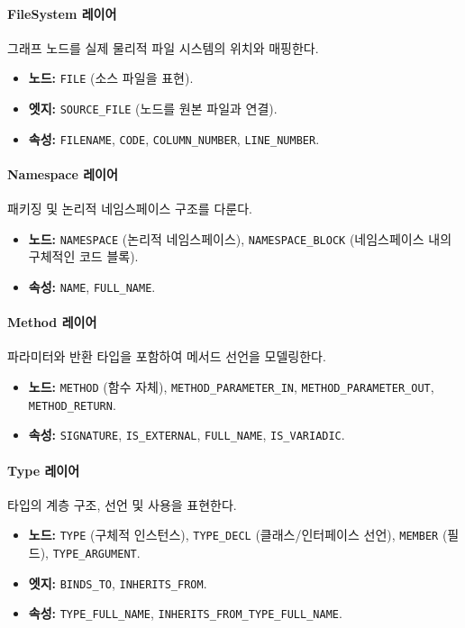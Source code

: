 \paragraph{FileSystem 레이어} 그래프 노드를 실제 물리적 파일 시스템의 위치와 매핑한다.
\begin{itemize} \setlength{\itemsep}{0pt} \setlength{\parskip}{0pt} \setlength{\topsep}{0pt} \setlength{\partopsep}{0pt}
    \item \textbf{노드:} \texttt{FILE} (소스 파일을 표현).
    \item \textbf{엣지:} \texttt{SOURCE\_FILE} (노드를 원본 파일과 연결).
    \item \textbf{속성:} \texttt{FILENAME}, \texttt{CODE}, \texttt{COLUMN\_NUMBER}, \texttt{LINE\_NUMBER}.
\end{itemize}

\paragraph{Namespace 레이어} 패키징 및 논리적 네임스페이스 구조를 다룬다.
\begin{itemize} \setlength{\itemsep}{0pt} \setlength{\parskip}{0pt} \setlength{\topsep}{0pt} \setlength{\partopsep}{0pt}
    \item \textbf{노드:} \texttt{NAMESPACE} (논리적 네임스페이스), \texttt{NAMESPACE\_BLOCK} (네임스페이스 내의 구체적인 코드 블록).
    \item \textbf{속성:} \texttt{NAME}, \texttt{FULL\_NAME}.
\end{itemize}

\paragraph{Method 레이어} 파라미터와 반환 타입을 포함하여 메서드 선언을 모델링한다.
\begin{itemize} \setlength{\itemsep}{0pt} \setlength{\parskip}{0pt} \setlength{\topsep}{0pt} \setlength{\partopsep}{0pt}
    \item \textbf{노드:} \texttt{METHOD} (함수 자체), \texttt{METHOD\_PARAMETER\_IN}, \texttt{METHOD\_PARAMETER\_OUT}, \texttt{METHOD\_RETURN}.
    \item \textbf{속성:} \texttt{SIGNATURE}, \texttt{IS\_EXTERNAL}, \texttt{FULL\_NAME}, \texttt{IS\_VARIADIC}.
\end{itemize}

\paragraph{Type 레이어} 타입의 계층 구조, 선언 및 사용을 표현한다.
\begin{itemize} \setlength{\itemsep}{0pt} \setlength{\parskip}{0pt} \setlength{\topsep}{0pt} \setlength{\partopsep}{0pt}
    \item \textbf{노드:} \texttt{TYPE} (구체적 인스턴스), \texttt{TYPE\_DECL} (클래스/인터페이스 선언), \texttt{MEMBER} (필드), \texttt{TYPE\_ARGUMENT}.
    \item \textbf{엣지:} \texttt{BINDS\_TO}, \texttt{INHERITS\_FROM}.
    \item \textbf{속성:} \texttt{TYPE\_FULL\_NAME}, \texttt{INHERITS\_FROM\_TYPE\_FULL\_NAME}.
\end{itemize}

